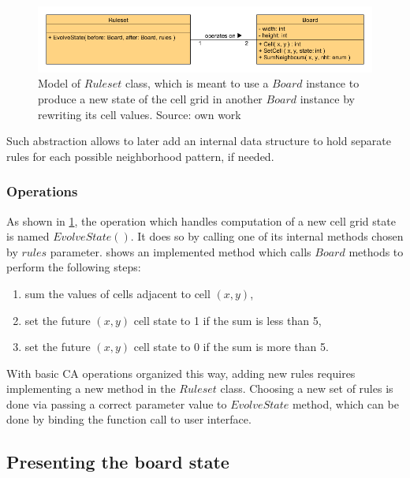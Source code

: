 \documentclass[12pt]{report}
\begin{document}
\begin{figure}[H]
	\centering
	\includegraphics[width=0.9\linewidth]{diagrams/ruleset-board}
	\caption{Model of $Ruleset$ class, which is meant to use a $Board$ instance to produce a new state of the cell grid in another $Board$ instance by rewriting its cell values. Source: own work}
	\label{fig:ruleset-board}
\end{figure}

Such abstraction allows to later add an internal data structure to hold separate rules for each possible neighborhood pattern, if needed. 

\subsubsection{Operations}

As shown in \cref{fig:ruleset-board}, the operation which handles computation of a new cell grid state is named $EvolveState()$. It does so by calling one of its internal methods chosen by $rules$ parameter.  shows an implemented method which calls $Board$ methods to perform the following steps:

\begin{enumerate}
	\item sum the values of cells adjacent to cell $(x,y)$,
	\item set the future $(x,y)$ cell state to 1 if the sum is less than 5,
	\item set the future $(x,y)$ cell state to 0 if the sum is more than 5.
\end{enumerate}




With basic CA operations organized this way, adding new rules requires implementing a new method in the $Ruleset$ class. Choosing a new set of rules is done via passing a correct parameter value to $EvolveState$ method, which can be done by binding the function call to user interface.

\subsection{Presenting the board state}
\end{document}
